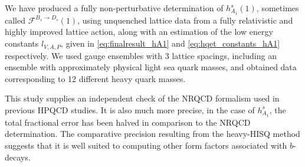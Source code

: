 We have produced a fully non-perturbative determination of $h_{A_1}^s(1)$, sometimes called $\mathcal{F}^{B_s\to D_s}(1)$, using unquenched lattice data from a fully relativistic and highly improved lattice action, along with an estimation of the low energy constants $l_{V,A,P}$, given in \eqref{eq:finalresult_hA1} and \eqref{eq:hqet_constants_hA1} respectively. We used gauge ensembles with 3 lattice spacings, including an ensemble with approximately physical light sea quark masses, and obtained data corresponding to 12 different heavy quark masses.

This study supplies an independent check of the NRQCD formalism used in previous HPQCD studies. It is also much more precise, in the case of $h_{A_1}^s$, the total fractional error has been halved in comparison to the NRQCD determination. The comparative precision resulting from the heavy-HISQ method suggests that it is well suited to computing other form factors associated with $b$-decays. 



